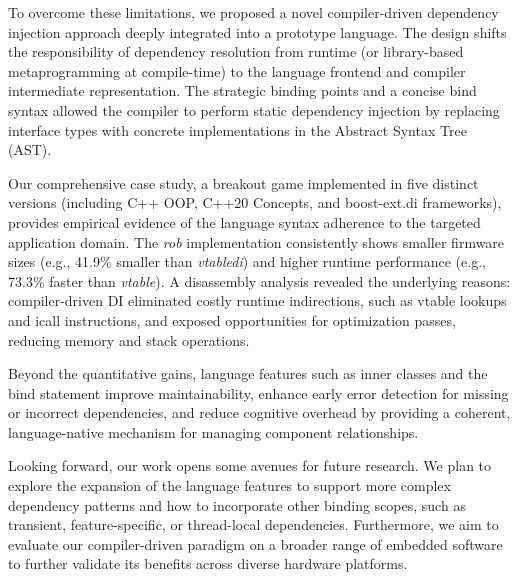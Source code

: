 \documentclass[10pt,sigplan,screen,anonymous]{acmart}
\begin{document}
To overcome these limitations, we proposed a novel compiler-driven dependency injection approach deeply integrated into a prototype language. The design shifts the responsibility of dependency resolution from runtime (or library-based metaprogramming at compile-time) to the language frontend and compiler intermediate representation. The strategic binding points and a concise bind syntax allowed the compiler to perform static dependency injection by replacing interface types with concrete implementations in the Abstract Syntax Tree (AST).

Our comprehensive case study, a breakout game implemented in five distinct versions (including C++ OOP, C++20 Concepts, and boost-ext.di frameworks), provides empirical evidence of the language syntax adherence to the targeted application domain. The \emph{rob} implementation consistently shows smaller firmware sizes (e.g., 41.9\% smaller than \emph{vtabledi}) and higher runtime performance (e.g., 73.3\% faster than \emph{vtable}). A disassembly analysis revealed the underlying reasons: compiler-driven DI eliminated costly runtime indirections, such as vtable lookups and icall instructions, and exposed opportunities for optimization passes, reducing memory and stack operations. 

Beyond the quantitative gains, language features such as inner classes and the bind statement improve maintainability, enhance early error detection for missing or incorrect dependencies, and reduce cognitive overhead by providing a coherent, language-native mechanism for managing component relationships.

Looking forward, our work opens some avenues for future research. We plan to explore the expansion of the language features to support more complex dependency patterns and how to incorporate other binding scopes, such as transient, feature-specific, or thread-local dependencies. Furthermore, we aim to evaluate our compiler-driven paradigm on a broader range of embedded software to further validate its benefits across diverse hardware platforms.



\end{document}

